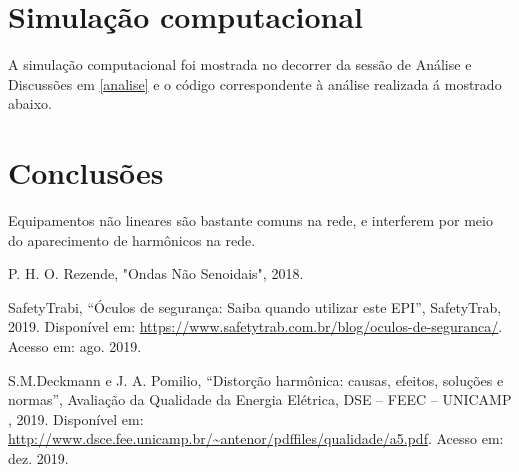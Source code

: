 \documentclass[a4paper,12pt,oneside,openany,table,xcdraw]{article}
\begin{document}
\newpage
\section{Simulação computacional} %
A simulação computacional foi mostrada no decorrer da sessão de Análise e Discussões em \ref{analise} e o código correspondente à análise realizada á mostrado abaixo.
\vspace{0.3cm}


\vspace{2cm}

\newpage
\section{Conclusões} %
Equipamentos não lineares são bastante comuns na rede, e interferem por meio do aparecimento de harmônicos na rede.

\newpage
\begin{thebibliography}{9} 
    P. H. O. Rezende,
    "Ondas Não Senoidais", 2018.

    SafetyTrabi,
    “Óculos de segurança: Saiba quando utilizar este EPI”, SafetyTrab, 2019.
 Disponível em:
 \url{https://www.safetytrab.com.br/blog/oculos-de-seguranca/}. Acesso em: ago. 2019.

    S.M.Deckmann e J. A. Pomilio,
    “Distorção harmônica: causas, efeitos, soluções e normas”, Avaliação da Qualidade da Energia Elétrica, DSE – FEEC – UNICAMP , 2019.
 Disponível em:
 \url{http://www.dsce.fee.unicamp.br/~antenor/pdffiles/qualidade/a5.pdf}. Acesso em: dez. 2019.

\end{thebibliography}
\end{document}
